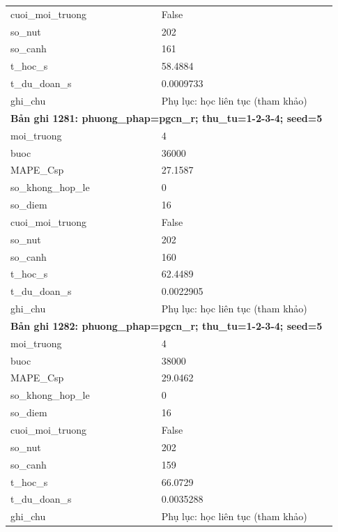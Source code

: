 \begin{longtable}{p{0.43\linewidth}p{0.50\linewidth}}
cuoi\_\allowbreak moi\_\allowbreak truong & False \\
so\_\allowbreak nut & 202 \\
so\_\allowbreak canh & 161 \\
t\_\allowbreak hoc\_\allowbreak s & 58.4884 \\
t\_\allowbreak du\_\allowbreak doan\_\allowbreak s & 0.0009733 \\
ghi\_\allowbreak chu & Phụ lục: học liên tục (tham khảo) \\
\midrule
\multicolumn{2}{p{0.95\linewidth}}{\textbf{Bản ghi 1281: phuong\_phap=pgcn\_r; thu\_tu=1-2-3-4; seed=5}} \\
moi\_\allowbreak truong & 4 \\
buoc & 36000 \\
MAPE\_\allowbreak Csp & 27.1587 \\
so\_\allowbreak khong\_\allowbreak hop\_\allowbreak le & 0 \\
so\_\allowbreak diem & 16 \\
cuoi\_\allowbreak moi\_\allowbreak truong & False \\
so\_\allowbreak nut & 202 \\
so\_\allowbreak canh & 160 \\
t\_\allowbreak hoc\_\allowbreak s & 62.4489 \\
t\_\allowbreak du\_\allowbreak doan\_\allowbreak s & 0.0022905 \\
ghi\_\allowbreak chu & Phụ lục: học liên tục (tham khảo) \\
\midrule
\multicolumn{2}{p{0.95\linewidth}}{\textbf{Bản ghi 1282: phuong\_phap=pgcn\_r; thu\_tu=1-2-3-4; seed=5}} \\
moi\_\allowbreak truong & 4 \\
buoc & 38000 \\
MAPE\_\allowbreak Csp & 29.0462 \\
so\_\allowbreak khong\_\allowbreak hop\_\allowbreak le & 0 \\
so\_\allowbreak diem & 16 \\
cuoi\_\allowbreak moi\_\allowbreak truong & False \\
so\_\allowbreak nut & 202 \\
so\_\allowbreak canh & 159 \\
t\_\allowbreak hoc\_\allowbreak s & 66.0729 \\
t\_\allowbreak du\_\allowbreak doan\_\allowbreak s & 0.0035288 \\
ghi\_\allowbreak chu & Phụ lục: học liên tục (tham khảo) \\

\end{longtable}
